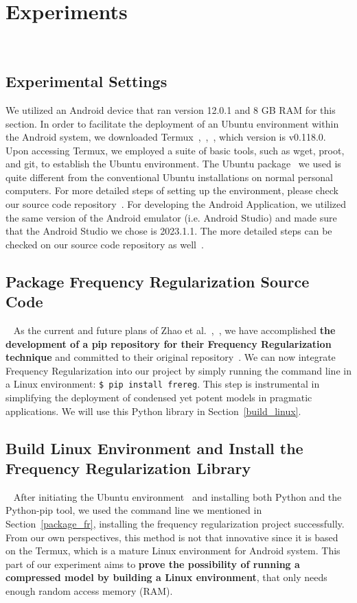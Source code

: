 \documentclass[runningheads]{llncs}
\begin{document}
\section{Experiments} ~\label{experiments}
\subsection{Experimental Settings}
We utilized an Android device that ran version 12.0.1 and 8 GB RAM for this section. In order to facilitate the deployment of an Ubuntu environment within the Android system, we downloaded Termux~\cite{termux_repo},~\cite{termux_overview},~\cite{termux_wiki}, which version is v0.118.0. Upon accessing Termux, we employed a suite of basic tools, such as wget, proot, and git, to establish the Ubuntu environment. The Ubuntu package~\cite{ubuntu_in_termux_repo} we used is quite different from the conventional Ubuntu installations on normal personal computers. For more detailed steps of setting up the environment, please check our source code repository~\cite{nerual_on_mobile_repo}. For developing the Android Application, we utilized the same version of the Android emulator (i.e. Android Studio) and made sure that the Android Studio we chose is 2023.1.1. The more detailed steps can be checked on our source code repository as well~\cite{nerual_on_mobile_repo}.


\subsection{Package Frequency Regularization Source Code}~\label{package_fr}
As the current and future plans of Zhao et al.~\cite{fr_repo},~\cite{zhao2023fr}, we have accomplished \textbf{the development of a pip repository for their Frequency Regularization technique} and committed to their original repository~\cite{fr_repo}. We can now integrate Frequency Regularization into our project by simply running the command line in a Linux environment: \texttt{\$ pip install frereg}. This step is instrumental in simplifying the deployment of condensed yet potent models in pragmatic applications. We will use this Python library in Section~\ref{build_linux}.

\subsection{Build Linux Environment and Install the Frequency Regularization Library} ~\label{build_linux}
After initiating the Ubuntu environment~\cite{ubuntu_in_termux_repo} and installing both Python and the Python-pip tool, we used the command line we mentioned in Section~\ref{package_fr}, installing the frequency regularization project successfully. From our own perspectives, this method is not that innovative since it is based on the Termux, which is a mature Linux environment for Android system. This part of our experiment aims to \textbf{prove the possibility of running a compressed model by building a Linux environment}, that only needs enough random access memory (RAM).
\end{document}
